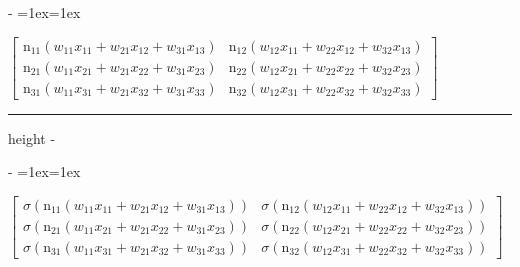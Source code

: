 \documentclass[letterpaper,10pt,english]{sphinxmanual}
\makeatletter
\newenvironment{nbsphinxfancyoutput}{%
    \let\sphinxincludegraphics\nbsphinxincludegraphics
    \nbsphinx@image@maxheight\textheight
    \advance\nbsphinx@image@maxheight -2\fboxsep   %
    \advance\nbsphinx@image@maxheight -2\fboxrule  %
    \advance\nbsphinx@image@maxheight -\baselineskip
\def\nbsphinxfcolorbox{\spx@fcolorbox{nbsphinx-code-border}{white}}%
\def\FrameCommand{\nbsphinxfcolorbox\nbsphinxfancyaddprompt\@empty}%
\def\FirstFrameCommand{\nbsphinxfcolorbox\nbsphinxfancyaddprompt\sphinxVerbatim@Continues}%
\def\MidFrameCommand{\nbsphinxfcolorbox\sphinxVerbatim@Continued\sphinxVerbatim@Continues}%
\def\LastFrameCommand{\nbsphinxfcolorbox\sphinxVerbatim@Continued\@empty}%
\MakeFramed{\advance\hsize-\width\@totalleftmargin\z@\linewidth\hsize\@setminipage}%
\lineskip=1ex\lineskiplimit=1ex\raggedright%
}{\par\unskip\@minipagefalse\endMakeFramed}
\def\nbsphinxfancyaddprompt{\ifvoid\nbsphinxpromptbox\else
    \kern\fboxrule\kern\fboxsep
    \copy\nbsphinxpromptbox
    \kern-\ht\nbsphinxpromptbox\kern-\dp\nbsphinxpromptbox
    \kern-\fboxsep\kern-\fboxrule\nointerlineskip
    \fi}
\newlength\nbsphinxcodecellspacing
\newcommand*{\nbsphinxincludegraphics}[2][]{%
    \gdef\spx@includegraphics@options{#1}%
    \setbox\spx@image@box\hbox{\texttt{[image: \#2]}}%
    \in@false
    \ifdim \wd\spx@image@box>\linewidth
      \g@addto@macro\spx@includegraphics@options{,width=\linewidth}%
      \in@true
    \fi
    \ifdim \ht\spx@image@box>\nbsphinx@image@maxheight
      \g@addto@macro\spx@includegraphics@options{,height=\nbsphinx@image@maxheight}%
      \in@true
    \fi
    \ifin@
      \g@addto@macro\spx@includegraphics@options{,keepaspectratio}%
    \fi
    \setbox\spx@image@box\box\voidb@x %
    \expandafter\includegraphics\expandafter[\spx@includegraphics@options]{#2}%
}%
\makeatother
\begin{document}
\savebox\nbsphinxpromptbox[0pt][r]{\color{nbsphinxout}\Verb|\strut{[49]:}\,|}

\begin{nbsphinxfancyoutput}
$\displaystyle \left[\begin{matrix}\operatorname{n_{11}}{\left(w_{11} x_{11} + w_{21} x_{12} + w_{31} x_{13} \right)} & \operatorname{n_{12}}{\left(w_{12} x_{11} + w_{22} x_{12} + w_{32} x_{13} \right)}\\\operatorname{n_{21}}{\left(w_{11} x_{21} + w_{21} x_{22} + w_{31} x_{23} \right)} & \operatorname{n_{22}}{\left(w_{12} x_{21} + w_{22} x_{22} + w_{32} x_{23} \right)}\\\operatorname{n_{31}}{\left(w_{11} x_{31} + w_{21} x_{32} + w_{31} x_{33} \right)} & \operatorname{n_{32}}{\left(w_{12} x_{31} + w_{22} x_{32} + w_{32} x_{33} \right)}\end{matrix}\right]$
\end{nbsphinxfancyoutput}

{
\begin{sphinxVerbatim}[commandchars=\\\{\}]
\llap{\color{nbsphinxin}[50]:\,\hspace{\fboxrule}\hspace{\fboxsep}}   
\end{sphinxVerbatim}
}

\hrule height -\fboxrule\relax
\vspace{\nbsphinxcodecellspacing}

\savebox\nbsphinxpromptbox[0pt][r]{\color{nbsphinxout}\Verb|\strut{[50]:}\,|}

\begin{nbsphinxfancyoutput}
$\displaystyle \left[\begin{matrix}\sigma{\left(\operatorname{n_{11}}{\left(w_{11} x_{11} + w_{21} x_{12} + w_{31} x_{13} \right)} \right)} & \sigma{\left(\operatorname{n_{12}}{\left(w_{12} x_{11} + w_{22} x_{12} + w_{32} x_{13} \right)} \right)}\\\sigma{\left(\operatorname{n_{21}}{\left(w_{11} x_{21} + w_{21} x_{22} + w_{31} x_{23} \right)} \right)} & \sigma{\left(\operatorname{n_{22}}{\left(w_{12} x_{21} + w_{22} x_{22} + w_{32} x_{23} \right)} \right)}\\\sigma{\left(\operatorname{n_{31}}{\left(w_{11} x_{31} + w_{21} x_{32} + w_{31} x_{33} \right)} \right)} & \sigma{\left(\operatorname{n_{32}}{\left(w_{12} x_{31} + w_{22} x_{32} + w_{32} x_{33} \right)} \right)}\end{matrix}\right]$
\end{nbsphinxfancyoutput}
\end{document}
